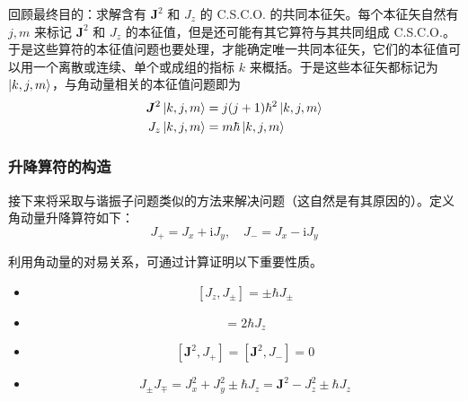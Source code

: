 \documentclass[cn,10pt,math=newtx,citestyle=gb7714-2015,bibstyle=gb7714-2015]{elegantbook}
\def\bm{\boldsymbol}
\def\i{\mathrm i}
\begin{document}
回顾最终目的：求解含有 $\bm J^2$ 和 $J_z$ 的 C.S.C.O. 的共同本征矢。每个本征矢自然有 $j,m$ 来标记 $\bm J^2$ 和 $J_z$ 的本征值，但是还可能有其它算符与其共同组成 C.S.C.O.。于是这些算符的本征值问题也要处理，才能确定唯一共同本征矢，它们的本征值可以用一个离散或连续、单个或成组的指标 $k$ 来概括。于是这些本征矢都标记为 $\ket{k,j,m}$，与角动量相关的本征值问题即为
\begin{align}
    \bm J^2\ket{k,j,m} & = j(j+1)\hbar^2\ket{k,j,m}\\
    J_z\ket{k,j,m} & = m\hbar \ket{k,j,m}
\end{align}

\subsubsection{升降算符的构造}


接下来将采取与谐振子问题类似的方法来解决问题（这自然是有其原因的）。定义角动量升降算符如下：
\begin{equation}
    J_+=J_x+\i J_y,\quad J_-=J_x-\i J_y
\end{equation}

利用角动量的对易关系，可通过计算证明以下重要性质。
\begin{itemize}
    \item
    \begin{equation}\label{eq:cmmt_Jz_J+-}
        [J_z,J_\pm] = \pm\hbar J_\pm
    \end{equation}
    \item
    \begin{equation}
        [J_+,J_-] = 2\hbar J_z
    \end{equation}
    \item
    \begin{equation}\label{eq:cmmt_J2_J+-}
        [\bm J^2,J_+] = [\bm J^2,J_-] = 0
    \end{equation}
    \item 
    \begin{equation}\label{eq:J_+-J_-+}
        J_\pm J_\mp = J_x^2+J_y^2\pm \hbar J_z = \bm J^2-J_z^2\pm\hbar J_z
    \end{equation}
\end{itemize}
\end{document}
